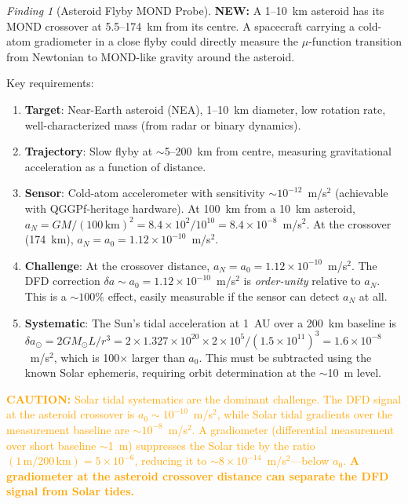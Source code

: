 \documentclass[11pt]{article}
\theoremstyle{definition}
\theoremstyle{remark}
\newtheorem{finding}[theorem]{Finding}
\newcommand{\ee}[1]{\times10^{#1}}
\newcommand{\azero}{a_0}
\newcommand{\caution}[1]{\textcolor{orange}{\textbf{CAUTION:} #1}}
\newcommand{\newresult}[1]{\textcolor{green!50!black}{\textbf{NEW:} #1}}
\begin{document}
\begin{finding}[Asteroid Flyby MOND Probe]
\label{find:asteroid}
\newresult{A 1--10~km asteroid has its MOND crossover at
5.5--174~km from its centre. A spacecraft carrying a cold-atom
gradiometer in a close flyby could directly measure the
$\mu$-function transition from Newtonian to MOND-like gravity
around the asteroid.}

Key requirements:
\begin{enumerate}[nosep]
\item \textbf{Target}: Near-Earth asteroid (NEA), 1--10~km diameter,
  low rotation rate, well-characterized mass (from radar or
  binary dynamics).
\item \textbf{Trajectory}: Slow flyby at $\sim$5--200~km from centre,
  measuring gravitational acceleration as a function of distance.
\item \textbf{Sensor}: Cold-atom accelerometer with sensitivity
  $\sim 10^{-12}$~m/s$^2$ (achievable with QGGPf-heritage hardware).
  At 100~km from a 10~km asteroid, $a_N = GM/(100\,\mathrm{km})^2
  = 8.4\ee{2} / 10^{10} = 8.4\ee{-8}$~m/s$^2$. At the crossover
  (174~km), $a_N = \azero = 1.12\ee{-10}$~m/s$^2$.
\item \textbf{Challenge}: At the crossover distance, $a_N = \azero
  = 1.12\ee{-10}$~m/s$^2$. The DFD correction $\delta a \sim \azero
  = 1.12\ee{-10}$~m/s$^2$ is \emph{order-unity} relative to $a_N$.
  This is a $\sim 100\%$ effect, easily measurable if the sensor
  can detect $a_N$ at all.
\item \textbf{Systematic}: The Sun's tidal acceleration at 1~AU
  over a 200~km baseline is $\delta a_\odot = 2 G M_\odot L / r^3
  = 2 \times 1.327\ee{20} \times 2\ee{5} / (1.5\ee{11})^3
  = 1.6\ee{-8}$~m/s$^2$, which is 100$\times$ larger than
  $\azero$. This must be subtracted using the known Solar
  ephemeris, requiring orbit determination at the $\sim$10~m
  level.
\end{enumerate}

\caution{Solar tidal systematics are the dominant challenge.
The DFD signal at the asteroid crossover is $\azero \sim
10^{-10}$~m/s$^2$, while Solar tidal gradients over the
measurement baseline are $\sim 10^{-8}$~m/s$^2$. A gradiometer
(differential measurement over short baseline $\sim$1~m) suppresses
the Solar tide by the ratio $(1\,\mathrm{m} / 200\,\mathrm{km})
= 5\ee{-6}$, reducing it to $\sim 8\ee{-14}$~m/s$^2$---below
$\azero$. \textbf{A gradiometer at the asteroid crossover distance
can separate the DFD signal from Solar tides.}}


\end{finding}
\end{document}
